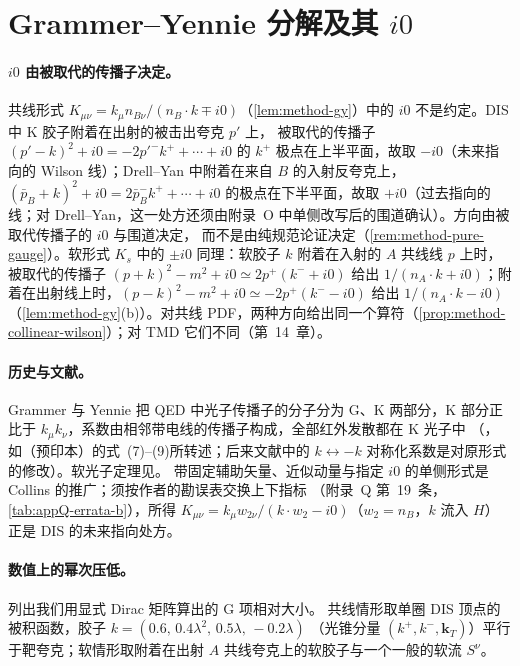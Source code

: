 \section{Grammer--Yennie 分解及其 \texorpdfstring{$i0$}{i0}}\label{sec:appF-gy}

\paragraph{$i0$ 由被取代的传播子决定。}共线形式 $K_{\mu\nu}=k_\mu n_{B\nu}/(n_B\cdot k\mp i0)$（\cref{lem:method-gy}）中的 $i0$ 不是约定。DIS 中 K 胶子附着在出射的被击出夸克 $p'$ 上，
被取代的传播子 $(p'-k)^2+i0=-2p'^-k^++\cdots+i0$ 的 $k^+$ 极点在上半平面，故取 $-i0$（未来指向的 Wilson 线）；Drell--Yan 中附着在来自 $B$ 的入射反夸克上，
$(\bar p_B+k)^2+i0=2\bar p_B^-k^++\cdots+i0$ 的极点在下半平面，故取 $+i0$（过去指向的线；对 Drell--Yan，这一处方还须由附录~O 中单侧改写后的围道确认）。方向由被取代传播子的 $i0$ 与围道决定，
而不是由纯规范论证决定（\cref{rem:method-pure-gauge}）。软形式 $K_s$ 中的 $\pm i0$ 同理：软胶子 $k$ 附着在入射的 $A$ 共线线 $p$ 上时，被取代的传播子 $(p+k)^2-m^2+i0\simeq2p^+(k^-+i0)$ 给出 $1/(n_A\cdot k+i0)$；附着在出射线上时，$(p-k)^2-m^2+i0\simeq-2p^+(k^--i0)$ 给出 $1/(n_A\cdot k-i0)$（\cref{lem:method-gy}(b)）。对共线 PDF，两种方向给出同一个算符（\cref{prop:method-collinear-wilson}）；对 TMD 它们不同（第~14~章）。

\paragraph{历史与文献。}Grammer 与 Yennie 把 QED 中光子传播子的分子分为 G、K 两部分，K 部分正比于 $k_\mu k_\nu$，系数由相邻带电线的传播子构成，全部红外发散都在 K 光子中
（\cite{GrammerYennie1973}，如\cite{SenIndumathiChoudhury2019}（预印本）的式~(7)--(9)所转述；后来文献中的 $k\leftrightarrow-k$ 对称化系数是对原形式的修改）。软光子定理见\cite{Weinberg1965}。
带固定辅助矢量、近似动量与指定 $i0$ 的单侧形式是 Collins 的推广\cite[第~5.5.6、10.6、11.9.3~节]{Collins2011}；\cite[式~(11.4)--(11.6)]{Collins2011}须按作者的勘误表交换上下指标
（附录~Q 第~19~条，\cref{tab:appQ-errata-b}），所得 $K_{\mu\nu}=k_\mu w_{2\nu}/(k\cdot w_2-i0)$（$w_2=n_B$，$k$ 流入 $H$）正是 DIS 的未来指向处方。

\paragraph{数值上的幂次压低。}列出我们用显式 Dirac 矩阵算出的 G 项相对大小。%
共线情形取单圈 DIS 顶点的被积函数，胶子 $k=(0.6,\,0.4\lambda^2,\,0.5\lambda,\,-0.2\lambda)$
（光锥分量 $(k^+,k^-,\mathbf k_T)$）平行于靶夸克；软情形取附着在出射 $A$ 共线夸克上的软胶子与一个一般的软流 $S^\nu$。

